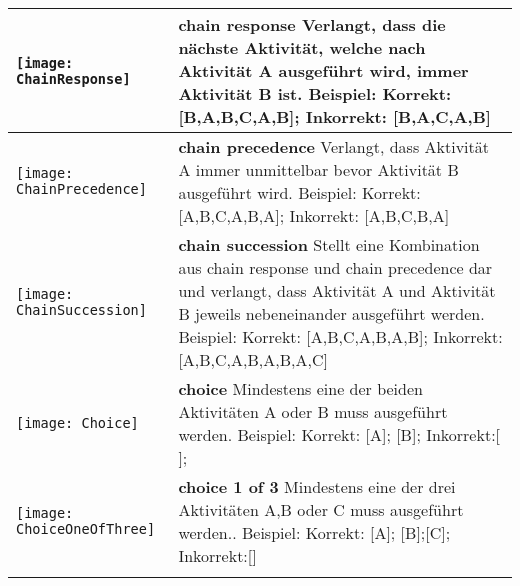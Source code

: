 \begin{longtable}{|p{}|p{}|}
\begin{center}
  \texttt{[image: ChainResponse]} %
    \end{center}&
 \textbf{chain response}\newline
  Verlangt, dass die nächste Aktivität, welche nach Aktivität A ausgeführt wird, immer Aktivität B ist. \newline
  Beispiel: Korrekt: [B,A,B,C,A,B]; Inkorrekt: [B,A,C,A,B]\\
\hline
\begin{center}

  \texttt{[image: ChainPrecedence]} %
    \end{center}&
\textbf{chain precedence} \newline
 Verlangt, dass Aktivität A immer unmittelbar bevor Aktivität B ausgeführt wird.\newline
 Beispiel: Korrekt: [A,B,C,A,B,A]; Inkorrekt: [A,B,C,B,A] \\
\hline
\begin{center}

  \texttt{[image: ChainSuccession]} %
    \end{center} &
\textbf{chain succession} \newline  Stellt eine Kombination aus chain response und chain precedence dar und verlangt, dass Aktivität A und Aktivität B jeweils nebeneinander ausgeführt werden. \newline
Beispiel: Korrekt: [A,B,C,A,B,A,B]; Inkorrekt: [A,B,C,A,B,A,B,A,C]\\
\hline
 
\begin{center}

  \texttt{[image: Choice]} %
    \end{center}&

\textbf{choice} \newline  Mindestens eine der beiden Aktivitäten A oder B muss ausgeführt werden.  \newline
Beispiel: Korrekt: [A]; [B]; Inkorrekt:[ ];
\\
\hline

\begin{center}
  \texttt{[image: ChoiceOneOfThree]} %
    \end{center} &
    \textbf{choice 1 of 3}\newline
Mindestens eine der drei Aktivitäten A,B oder C muss ausgeführt werden.. \newline
Beispiel: Korrekt: [A]; [B];[C]; Inkorrekt:[]
\\
\hline
\begin{center}


\end{center}
\end{longtable}
